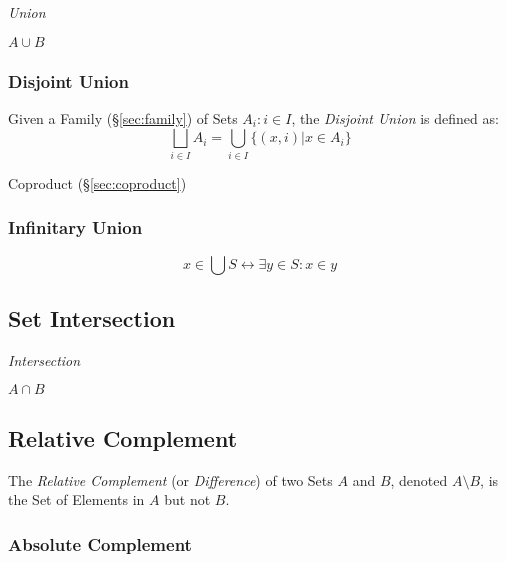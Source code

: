 \emph{Union}

$A \cup B$



\subsubsection{Disjoint Union}\label{sec:disjoint_union}

Given a Family (\S\ref{sec:family}) of Sets ${A_i : i \in I}$,
the \emph{Disjoint Union} is defined as:
\[
  \bigsqcup_{i \in I} A_i = \bigcup_{i \in I} \{(x,i) | x \in A_i \}
\]

Coproduct (\S\ref{sec:coproduct})



\subsubsection{Infinitary Union}\label{sec:infinitary_union}

\[
  x \in \bigcup S \leftrightarrow \exists y \in S : x \in y
\]



\subsection{Set Intersection}\label{sec:set_intersection}

\emph{Intersection}

$A \cap B$



\subsection{Relative Complement}\label{sec:relative_complement}

The \emph{Relative Complement} (or \emph{Difference}) of two Sets $A$
and $B$, denoted $A \setminus B$, is the Set of Elements in $A$ but
not $B$.



\subsubsection{Absolute Complement}\label{sec:absolute_complement}

